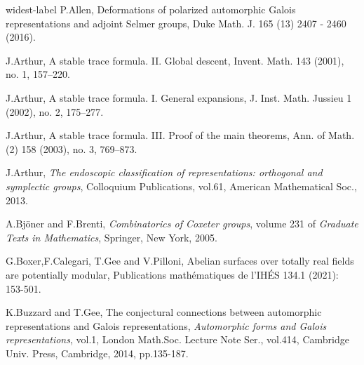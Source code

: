\documentclass[12pt,oneside,reqno]{amsart}
\theoremstyle{plain}
\begin{document}
	
	
	
	
	\printindex	
	
	
	
	\begin{thebibliography}{widest-label}
		P.Allen,
		Deformations of polarized automorphic Galois representations and adjoint Selmer groups,
		Duke Math. J. 165 (13) 2407 - 2460 (2016).
		
		
		J.Arthur,
		A stable trace formula. II. Global descent,
		Invent. Math. 143 (2001), no. 1, 157–220.
		
		
		J.Arthur,
		A stable trace formula. I. General expansions,
		J. Inst. Math. Jussieu 1 (2002), no. 2, 175–277.
		
		
		J.Arthur,
		A stable trace formula. III. Proof of the main theorems,
		Ann. of Math. (2) 158 (2003), no. 3, 769–873.
		
		
		
		
		J.Arthur,
		\textit{The endoscopic classification of
			representations: orthogonal and
			symplectic groups},
		Colloquium Publications,
		vol.61,
		American Mathematical Soc., 2013.
		
		
		
		
		A.Bj\"{o}ner and F.Brenti,
		\textit{Combinatorics of Coxeter groups},
		volume 231 of
		\textit{Graduate Texts in Mathematics},
		Springer, 
		New York,
		2005.
		
		
		
		
		
		
		
		
		
		G.Boxer,F.Calegari, T.Gee and V.Pilloni,
		Abelian surfaces over totally real fields are potentially modular,
		Publications math\'{e}matiques de l'IH\'{E}S 134.1 (2021): 153-501.
		
		
		
		K.Buzzard and T.Gee,
		The conjectural connections between automorphic representations
		and Galois representations,
		\textit{Automorphic forms and Galois representations},
		vol.1,
		London Math.Soc. Lecture Note Ser.,
		vol.414,
		Cambridge Univ. Press,
		Cambridge,
		2014,
		pp.135-187.
		

\end{thebibliography}
\end{document}
